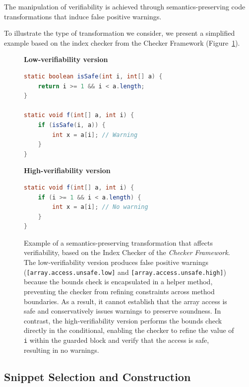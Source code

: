 The manipulation of verifiability is achieved through semantics-preserving code transformations that induce false positive warnings.

To illustrate the type of transformation we consider, we present a simplified example based on the index checker from the Checker Framework (Figure~\ref{fig:verifiability-example}). 

\begin{figure}[t]
\centering
\begin{minipage}{0.48\textwidth}
\textbf{Low-verifiability version}
\begin{lstlisting}[language=Java]
static boolean isSafe(int i, int[] a) {
    return i >= 1 && i < a.length;
}

static void f(int[] a, int i) {
    if (isSafe(i, a)) {
        int x = a[i]; // Warning
    }
}
\end{lstlisting}
\end{minipage}
\hfill
\begin{minipage}{0.48\textwidth}
\textbf{High-verifiability version}
\begin{lstlisting}[language=Java]
static void f(int[] a, int i) {
    if (i >= 1 && i < a.length) {
        int x = a[i]; // No warning
    }
}
\end{lstlisting}
\end{minipage}
\caption{Example of a semantics-preserving transformation that affects verifiability, based on the Index Checker of the \emph{Checker Framework}. The low-verifiability version produces false positive warnings (\lstinline{[array.access.unsafe.low]} and \lstinline{[array.access.unsafe.high]}) because the bounds check is encapsulated in a helper method, preventing the checker from refining constraints across method boundaries. As a result, it cannot establish that the array access is safe and conservatively issues warnings to preserve soundness. In contrast, the high-verifiability version performs the bounds check directly in the conditional, enabling the checker to refine the value of \lstinline{i} within the guarded block and verify that the access is safe, resulting in no warnings.}
\label{fig:verifiability-example}
\end{figure}

\subsection{Snippet Selection and Construction}
\label{sec:snippet-selection-construction}

